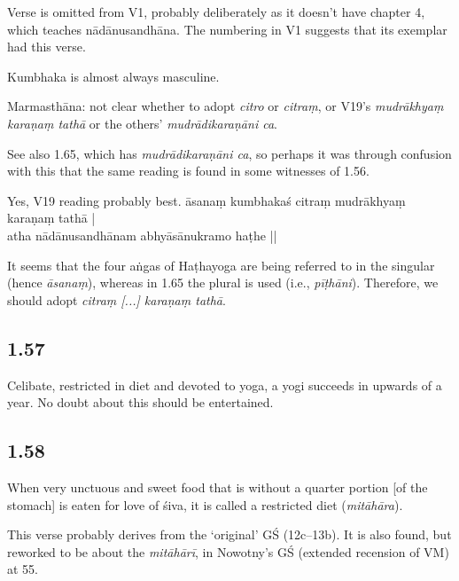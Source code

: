 \begin{ekdosis}
\begin{philcomm}[hp01_056]
Verse is omitted from V1, probably deliberately as it doesn’t have chapter 4, which teaches nādānusandhāna. The numbering in V1 suggests that its exemplar had this verse.

Kumbhaka is almost always masculine.

Marmasthāna: not clear whether to adopt \emph{citro} or \emph{citraṃ}, or V19’s \emph{mudrākhyaṃ karaṇaṃ tathā} or the others’ \emph{mudrādikaraṇāni ca}.

See also 1.65, which has \emph{mudrādikaraṇāni ca}, so perhaps it was through confusion with this that the same reading is found in some witnesses of 1.56.

Yes, V19 reading probably best.
\startverse
āsanaṃ kumbhakaś citraṃ mudrākhyaṃ karaṇaṃ tathā |\\
atha nādānusandhānam abhyāsānukramo haṭhe ||
\endverse

It seems that the four aṅgas of Haṭhayoga are being referred to in the singular (hence \emph{āsanaṃ}), whereas in 1.65 the plural is used (i.e., \emph{pīṭhāni}). Therefore, we should adopt \emph{citraṃ [...] karaṇaṃ tathā}.
\end{philcomm}

\subsection*{1.57}
\begin{translation}[hp01_057]
Celibate, restricted in diet and devoted to yoga, a yogi succeeds in upwards of a year. No doubt about this should be entertained.
\end{translation}


\subsection*{1.58}
\begin{translation}[hp01_058]
When very unctuous and sweet food that is without a quarter portion [of the stomach] is eaten for love of śiva, it is called a restricted diet (\emph{mitāhāra}).
\end{translation}

\begin{philcomm}[hp01_058]
This verse probably derives from the ‘original’ GŚ (12c–13b). It is also found, but reworked to be about the \emph{mitāhārī}, in Nowotny’s GŚ (extended recension of VM) at 55.
\end{philcomm}


\end{ekdosis}
